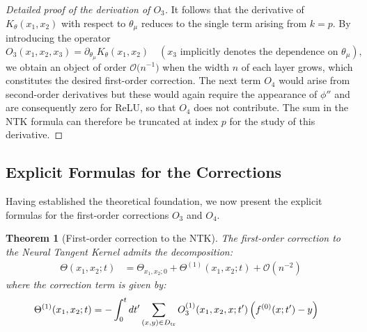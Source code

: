 \documentclass[11pt,a4paper]{article}
\newtheorem{theorem}{Theorem}[section]
\theoremstyle{definition}
\begin{document}
\begin{proof}[Detailed proof of the derivation of $O_3$]
It follows that the derivative of $K_{\theta}(x_1,x_2)$ with respect to $\theta_{\mu}$ reduces to the single term arising from $k=p$. By introducing the operator
\[
 O_3(x_1,x_2,x_3)=\partial_{\theta_{\mu}}K_{\theta}(x_1,x_2)\quad(\text{$x_3$ implicitly denotes the dependence on }\theta_{\mu}),
\]
we obtain an object of order $\mathcal O\bigl(n^{-1}\bigr)$ when the width $n$ of each layer grows, which constitutes the desired first-order correction. The next term $O_4$ would arise from second-order derivatives but these would again require the appearance of $\phi''$ and are consequently zero for ReLU, so that $O_4$ does not contribute. The sum in the NTK formula can therefore be truncated at index $p$ for the study of this derivative.
\end{proof}



\subsection{Explicit Formulas for the Corrections}

Having established the theoretical foundation, we now present the explicit formulas for the first-order corrections $O_3$ and $O_4$.

\begin{theorem}[First-order correction to the NTK]\label{thm:corrections}
The first-order correction to the Neural Tangent Kernel admits the decomposition:
\begin{align}
\Theta(x_1,x_2;t) &= \Theta_{x_1,x_2;0} + \Theta^{(1)}(x_1,x_2;t) + \mathcal{O}(n^{-2}) \label{eq:theta_expansion}
\end{align}
where the correction term is given by:
\begin{align}
\Theta^{(1)}(x_1,x_2;t) &= -\int_{0}^{t}dt'\sum_{(x,y)\in D_{\rm tr}}O^{(1)}_{3}(x_1,x_2,x;t')\left(f^{(0)}(x;t')-y\right) \label{eq:theta_correction}
\end{align}
\end{theorem}
\end{document}
